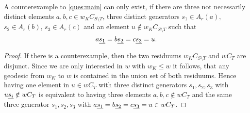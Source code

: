 \begin{lemm}
	A counterexample to \ref{ques:main} can only exist, if there are three not
	necessarily distinct elements $a,b,c \in w_K C_{S \setminus T}$, three
	distinct generators $s_1 \in A_r(a)$, $s_2 \in A_r(b)$, $s_3 \in A_r(c)$ and an
	element $u \notin w_K C_{S \setminus T}$ such that
	$$ a \underline{s_1} = b \underline{s_2} = c \underline{s_3} = u. $$

	\begin{proof}
		If there is a counterexample, then the two residuums $w_K C_{S \setminus T}$ and
		$w C_T$ are disjunct. Since we are only interested in $w$ with $w_K \leq w$
		it follows, that any geodesic from $w_K$ to $w$ is contained in the union set
		of both residuums. Hence having one element in $u \in w C_T$ with three distinct
		generators $s_1,s_2,s_3$ with $u \underline{s_i} \notin w C_T$ is equivalent to having
		three elements $a,b,c \notin w C_T$ and the same three generator $s_1,s_2,s_3$
		with $a \underline{s_1} = b \underline{s_2} = c \underline{s_3} = u \in w C_T$.
	\end{proof}
\end{lemm}